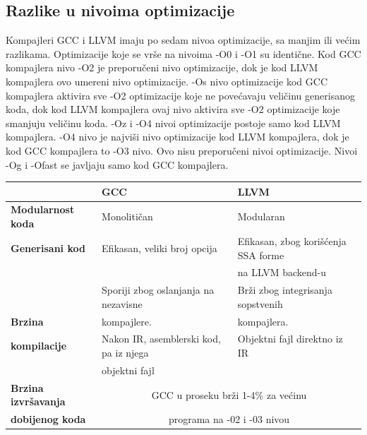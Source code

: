 \documentclass[a4paper]{article}
\begin{document}
\subsection{Razlike u nivoima optimizacije}
\label{subsec:nivoiRazlika}
Kompajleri GCC i LLVM imaju po sedam nivoa optimizacije, sa manjim ili većim razlikama. 
Optimizacije koje se vrše na nivoima -O0 i -O1 su identične. Kod GCC kompajlera nivo -O2 je preporučeni nivo optimizacije, dok je kod LLVM kompajlera ovo umereni nivo optimizacije. -Os nivo optimizacije kod GCC kompajlera aktivira sve -O2 optimizacije koje ne povećavaju veličinu generisanog koda, dok kod LLVM kompajlera ovaj nivo aktivira sve -O2 optimizacije koje smanjuju veličinu koda. -Oz i -O4 nivoi optimizacije postoje samo kod LLVM kompajlera. -O4 nivo je najviši nivo optimizacije kod LLVM kompajlera, dok je kod GCC kompajlera to -O3 nivo. Ovo nisu preporučeni nivoi optimizacije. Nivoi -Og i -Ofast se javljaju samo kod GCC kompajlera.
\\

\vspace{2em}
\hspace{-2em}
\begin{tabular}{ |p{3cm}||p{3cm}|p{3cm}|  }
    \hline
        & \textbf{GCC} & \textbf{LLVM} \\
    \hline
  \textbf{Modularnost koda} & Monolitičan & Modularan \\
  \hline
  \textbf{Generisani kod} & Efikasan, veliki broj opcija & Efikasan, zbog korišćenja SSA forme \\
  {}  &  & na LLVM backend-u \\
  \hline
  {} & Sporiji zbog oslanjanja na nezavisne & Brži zbog integrisanja sopstvenih \\  
  \textbf{Brzina} &  kompajlere.  &  kompajlera. \\  
  \textbf{kompilacije} & Nakon IR, asemblerski kod, pa iz njega & Objektni fajl direktno iz IR\\  
  {} &  objektni fajl &  \\  
  \hline
  \textbf{Brzina izvršavanja} &   \multicolumn{2}{|c|}{GCC u proseku brži 1-4\%  za većinu} \\
  \textbf{dobijenog koda}     &   \multicolumn{2}{|c|}{programa na -02 i -03 nivou}  \\  
  \hline
\end{tabular}
\vspace{2em}



\end{document}
